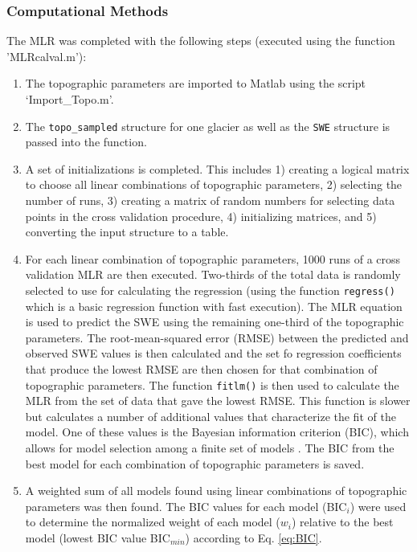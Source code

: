 \documentclass[12pt]{article}
\begin{document}
\subsubsection{Computational Methods}
\label{sec:MLRMethods}

The MLR was completed with the following steps (executed using the function 'MLRcalval.m'):
\begin{enumerate}
\item The topographic parameters are imported to Matlab using the script `Import\_Topo.m'.

\item The \texttt{topo\_sampled} structure for one glacier as well as the \texttt{SWE} structure is passed into the function.

\item A set of initializations is completed. This includes 1) creating a logical matrix to choose all linear combinations of topographic parameters, 2) selecting the number of runs, 3) creating a matrix of random numbers for selecting data points in the cross validation procedure, 4) initializing matrices, and 5) converting the input structure to a table.

\item For each linear combination of topographic parameters, 1000 runs of a cross validation MLR are then executed. Two-thirds of the total data is randomly selected \citep{Kohavi1995} to use for calculating the regression (using the function \texttt{regress()} which is a basic regression function with fast execution). The MLR equation is used to predict the SWE using the remaining one-third of the topographic parameters. The root-mean-squared error (RMSE) between the predicted and observed SWE values is then calculated and the set fo regression coefficients that produce the lowest RMSE are then chosen for that combination of topographic parameters. The function \texttt{fitlm()} is then used to calculate the MLR from the set of data that gave the lowest RMSE. This function is slower but calculates a number of additional values that characterize the fit of the model. One of these values is the Bayesian information criterion (BIC), which allows for model selection among a finite set of models \citep{Burnham2004}. The BIC from the best model for each combination of topographic parameters is saved.

\item A weighted sum of all models found using linear combinations of topographic parameters was then found. The BIC values for each model (BIC$_i$) were used to determine the normalized weight of each model ($w_i$) relative to the best model (lowest BIC value BIC$_{min}$) according to Eq. \ref{eq:BIC}.


\end{enumerate}
\end{document}
